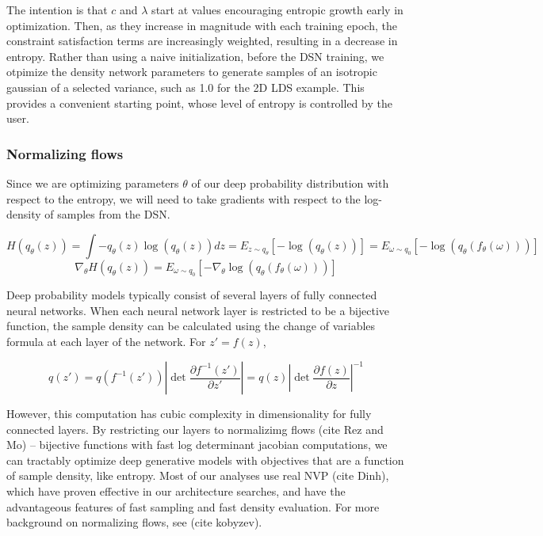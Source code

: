 \documentclass[11pt]{article}
\begin{document}
The intention is that $c$ and $\lambda$ start at values encouraging entropic growth early in optimization.  Then, as they increase in magnitude with each training epoch, the constraint satisfaction terms are increasingly weighted, resulting in a decrease in entropy.  Rather than using a naive initialization, before the DSN training, we otpimize the density network parameters to generate samples of an isotropic gaussian of a selected variance, such as 1.0 for the 2D LDS example.  This provides a convenient starting point, whose level of entropy is controlled by the user.

\subsubsection{Normalizing flows}
Since we are optimizing parameters  $\theta$ of our deep probability distribution with respect to the entropy, we will need to take gradients with respect to the log-density of samples from the DSN.

\begin{equation}
H(q_\theta(z)) = \int - q_\theta(z) \log(q_\theta(z)) dz = E_{z \sim q_\theta}\left[-\log(q_\theta(z)) \right] = E_{\omega \sim q_0}\left[-\log(q_\theta(f_\theta(\omega))) \right]
\end{equation}
\begin{equation}
\nabla_\theta H(q_\theta(z)) = E_{\omega \sim q_0}\left[- \nabla_\theta \log(q_\theta(f_\theta(\omega))) \right]
\end{equation}

Deep probability models typically consist of several layers of fully connected neural networks.  When each neural network layer is restricted to be a bijective function, the sample density can be calculated using the change of variables formula at each layer of the network.  For $z' = f(z)$,

\begin{equation}
q(z') = q(f^{-1}(z')) \left| \det \frac{\partial f^{-1}(z')}{\partial z'} \right| = q(z) \left| \det \frac{\partial f(z)}{\partial z} \right|^{-1}
\end{equation}

However, this computation has cubic complexity in dimensionality for fully connected layers.  By restricting our layers to normalizimg flows (cite Rez and Mo) -- bijective functions with fast log determinant jacobian computations, we can tractably optimize deep generative models with objectives that are a function of sample density, like entropy. Most of our analyses use real NVP (cite Dinh), which have proven effective in our architecture searches, and have the advantageous features of fast sampling and fast density evaluation.  For more background on normalizing flows, see (cite kobyzev).
\end{document}
